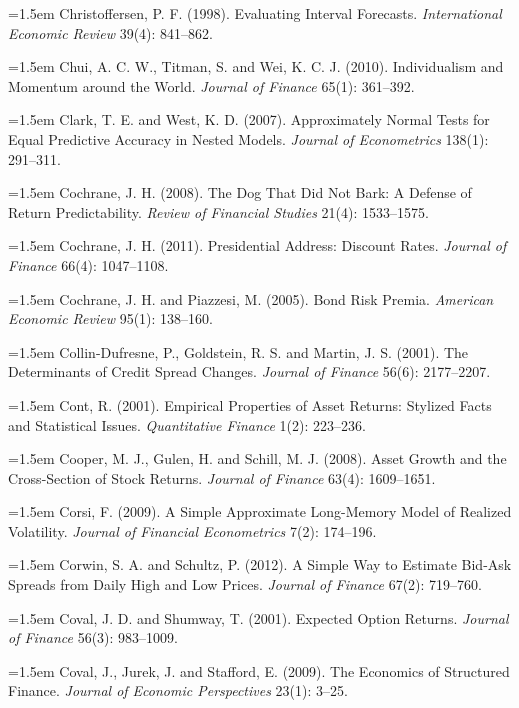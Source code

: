 \hangindent=1.5em Christoffersen, P. F. (1998). Evaluating Interval Forecasts. \emph{International Economic Review} 39(4): 841--862.

\hangindent=1.5em Chui, A. C. W., Titman, S. and Wei, K. C. J. (2010). Individualism and Momentum around the World. \emph{Journal of Finance} 65(1): 361--392.

\hangindent=1.5em Clark, T. E. and West, K. D. (2007). Approximately Normal Tests for Equal Predictive Accuracy in Nested Models. \emph{Journal of Econometrics} 138(1): 291--311.

\hangindent=1.5em Cochrane, J. H. (2008). The Dog That Did Not Bark: A Defense of Return Predictability. \emph{Review of Financial Studies} 21(4): 1533--1575.

\hangindent=1.5em Cochrane, J. H. (2011). Presidential Address: Discount Rates. \emph{Journal of Finance} 66(4): 1047--1108.

\hangindent=1.5em Cochrane, J. H. and Piazzesi, M. (2005). Bond Risk Premia. \emph{American Economic Review} 95(1): 138--160.

\hangindent=1.5em Collin-Dufresne, P., Goldstein, R. S. and Martin, J. S. (2001). The Determinants of Credit Spread Changes. \emph{Journal of Finance} 56(6): 2177--2207.

\hangindent=1.5em Cont, R. (2001). Empirical Properties of Asset Returns: Stylized Facts and Statistical Issues. \emph{Quantitative Finance} 1(2): 223--236.

\hangindent=1.5em Cooper, M. J., Gulen, H. and Schill, M. J. (2008). Asset Growth and the Cross-Section of Stock Returns. \emph{Journal of Finance} 63(4): 1609--1651.

\hangindent=1.5em Corsi, F. (2009). A Simple Approximate Long-Memory Model of Realized Volatility. \emph{Journal of Financial Econometrics} 7(2): 174--196.

\hangindent=1.5em Corwin, S. A. and Schultz, P. (2012). A Simple Way to Estimate Bid-Ask Spreads from Daily High and Low Prices. \emph{Journal of Finance} 67(2): 719--760.

\hangindent=1.5em Coval, J. D. and Shumway, T. (2001). Expected Option Returns. \emph{Journal of Finance} 56(3): 983--1009.

\hangindent=1.5em Coval, J., Jurek, J. and Stafford, E. (2009). The Economics of Structured Finance. \emph{Journal of Economic Perspectives} 23(1): 3--25.

